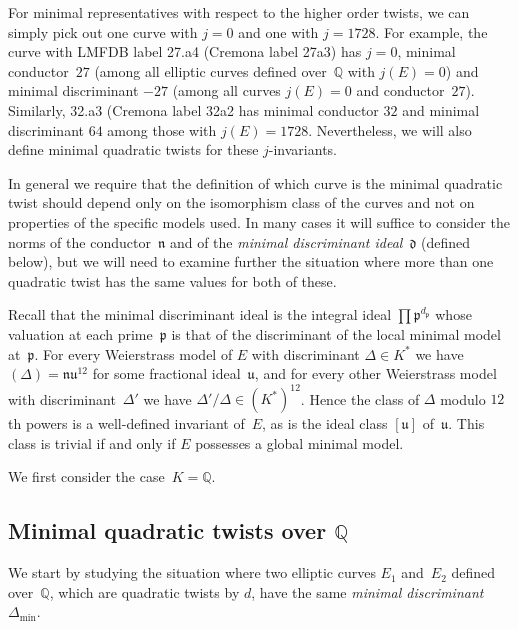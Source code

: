 \documentclass{article}
\def\Q{{\mathbb Q}}
\def\d{{\mathfrak d}}
\def\n{{\mathfrak n}}
\def\p{{\mathfrak p}}
\def\u{{\mathfrak u}}
\begin{document}
For minimal representatives with respect to the higher order twists,
we can simply pick out one curve with $j=0$ and one with $j=1728$. For
example, the curve with LMFDB label 27.a4 (Cremona label 27a3) has
$j=0$, minimal conductor~$27$ (among all elliptic curves defined
over~$\Q$ with $j(E)=0$) and minimal discriminant $-27$ (among all
curves $j(E)=0$ and conductor~$27$).  Similarly, 32.a3 (Cremona label
32a2 has minimal conductor $32$ and minimal discriminant $64$ among
those with $j(E)=1728$.  Nevertheless, we will also define minimal
quadratic twists for these $j$-invariants.

In general we require that the definition of which curve is the
minimal quadratic twist should depend only on the isomorphism class of
the curves and not on properties of the specific models used.  In many
cases it will suffice to consider the norms of the conductor~$\n$ and
of the \textit{minimal discriminant ideal}~$\d$ (defined below), but
we will need to examine further the situation where more than one
quadratic twist has the same values for both of these.

Recall that the minimal discriminant ideal is the integral ideal
$\prod\p^{d_{\p}}$ whose valuation at each prime~$\p$ is that of the
discriminant of the local minimal model at~$\p$.  For every
Weierstrass model of $E$ with discriminant $\Delta\in K^*$ we have
$(\Delta)=\n\u^{12}$ for some fractional ideal~$\u$, and for every
other Weierstrass model with discriminant~$\Delta'$ we have
$\Delta'/\Delta\in (K^*)^{12}$.  Hence the class of $\Delta$ modulo
$12$th powers is a well-defined invariant of~$E$, as is the ideal
class $[\u]$ of~$\u$.  This class is trivial if and only if $E$
possesses a global minimal model.

We first consider the case~$K=\Q$.

\subsection{Minimal quadratic twists over $\Q$}

We start by studying the situation where two elliptic curves $E_1$
and~$E_2$ defined over~$\Q$, which are quadratic twists by $d$, have
the same \textit{minimal discriminant}~$\Delta_{\text{min}}$.
\end{document}

